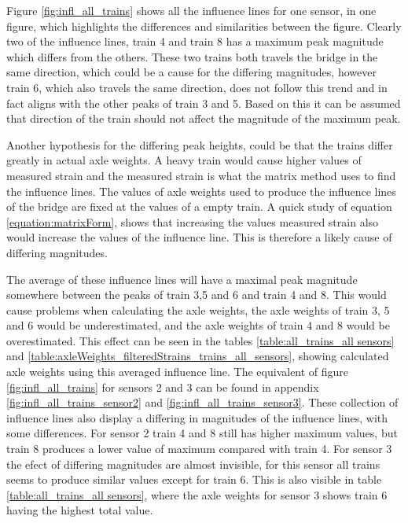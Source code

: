 Figure \ref{fig:infl_all_trains} shows all the influence lines for one sensor, in one figure, which highlights the differences and similarities between the figure. Clearly two of the influence lines, train 4 and train 8 has a maximum peak magnitude which differs from the others. These two trains both travels the bridge in the same direction, which could be a cause for the differing magnitudes, however train 6, which also travels the same direction, does not follow this trend and in fact aligns with the other peaks of train 3 and 5. Based on this it can be assumed that direction of the train should not affect the magnitude of the maximum peak.

Another hypothesis for the differing peak heights, could be that the trains differ greatly in actual axle weights. A heavy train would cause higher values of measured strain and the measured strain is what the matrix method uses to find the influence lines. The values of axle weights used to produce the influence lines of the bridge are fixed at the values of a empty train. A quick study of equation \ref{equation:matrixForm}, shows that increasing the values measured strain also would increase the values of the influence line. This is therefore a likely cause of differing magnitudes.

The average of these influence lines will have a maximal peak magnitude somewhere between the peaks of train 3,5 and 6 and train 4 and 8. This would cause problems when calculating the axle weights, the axle weights of train 3, 5 and 6 would be underestimated, and the axle weights of train 4 and 8 would be overestimated. This effect can be seen in the tables \ref{table:all_trains_all sensors} and \ref{table:axleWeights_filteredStrains_trains_all_sensors}, showing calculated axle weights using this averaged influence line. The equivalent of figure \ref{fig:infl_all_trains} for sensors 2 and 3 can be found in appendix \ref{fig:infl_all_trains_sensor2} and \ref{fig:infl_all_trains_sensor3}. These collection of influence lines also display a differing in magnitudes of the influence lines, with some differences. For sensor 2 train 4 and 8 still has higher maximum values, but train 8 produces a lower value of maximum compared with train 4. For sensor 3 the efect of differing magnitudes are almost invisible, for this sensor all trains seems to produce similar values except for train 6. This is also visible in table \ref{table:all_trains_all sensors}, where the axle weights for sensor 3 shows train 6 having the highest total value.

